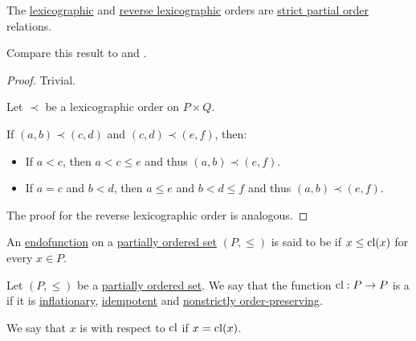 \begin{proposition}\label{thm:lexicographic_order_is_partial_order}
  The \hyperref[eq:def:lexicographic_order]{lexicographic} and \hyperref[eq:def:lexicographic_order/reverse]{reverse lexicographic} orders are \hyperref[def:partially_ordered_set/strict]{strict partial order} relations.

  Compare this result to  and .
\end{proposition}
\begin{proof}
   Trivial.

   Let \( \prec \) be a lexicographic order on \( P \times Q \).

  If \( (a, b) \prec (c, d) \) and \( (c, d) \prec (e, f) \), then:
  \begin{itemize}
    \item If \( a < c \), then \( a < c \leq e \) and thus \( (a, b) \prec (e, f) \).

    \item If \( a = c \) and \( b < d \), then \( a \leq e \) and \( b < d \leq f \) and thus \( (a, b) \prec (e, f) \).
  \end{itemize}

   The proof for the reverse lexicographic order is analogous.
\end{proof}

\begin{definition}\label{def:inflationary_function}
  An \hyperref[def:multi_valued_function/endofunction]{endofunction} on a \hyperref[def:partially_ordered_set]{partially ordered set} \( (P, \leq) \) is said to be  if \( x \leq \operatorname{cl}(x) \) for every \( x \in P \).
\end{definition}

\begin{definition}\label{def:closure_operator}
  Let \( (P, \leq) \) be a \hyperref[def:partially_ordered_set]{partially ordered set}. We say that the function \( \operatorname{cl}: P \to P \) is a  if it is \hyperref[def:inflationary_function]{inflationary}, \hyperref[def:magma/idempotent]{idempotent} and \hyperref[eq:def:partially_ordered_set/homomorphism/nonstrict]{nonstrictly order-preserving}.

  We say that \( x \) is  with respect to \( \operatorname{cl} \) if \( x = \operatorname{cl}(x) \).
\end{definition}

